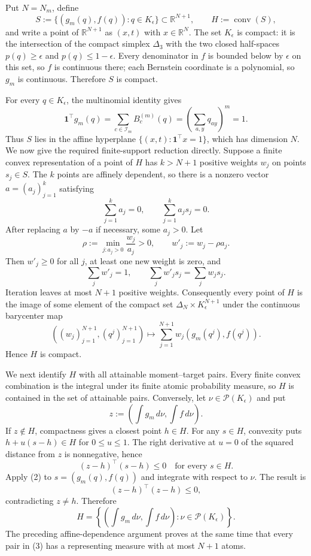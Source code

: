 Put \(N=N_m\), define
\[
 S:=\{(g_m(q),f(q)):q\in K_{\epsilon}\}\subset\mathbb R^{N+1},
 \qquad H:=\operatorname{conv}(S),
\]
and write a point of \(\mathbb R^{N+1}\) as \((x,t)\) with \(x\in\mathbb R^N\). The set \(K_{\epsilon}\) is compact: it is the intersection of the compact simplex \(\Delta_3\) with the two closed half-spaces \(p(q)\geq\epsilon\) and \(p(q)\leq1-\epsilon\). Every denominator in \(f\) is bounded below by \(\epsilon\) on this set, so \(f\) is continuous there; each Bernstein coordinate is a polynomial, so \(g_m\) is continuous. Therefore \(S\) is compact.

For every \(q\in K_{\epsilon}\), the multinomial identity gives
\[
 \mathbf 1^{\top}g_m(q)
 =\sum_{c\in\mathcal I_m}B_c^{(m)}(q)
 =\left(\sum_{a,y}q_{ay}\right)^m=1.
\tag{1}
\]
Thus \(S\) lies in the affine hyperplane \(\{(x,t):\mathbf 1^{\top}x=1\}\), which has dimension \(N\). We now give the required finite-support reduction directly. Suppose a finite convex representation of a point of \(H\) has \(k>N+1\) positive weights \(w_j\) on points \(s_j\in S\). The \(k\) points are affinely dependent, so there is a nonzero vector \(a=(a_j)_{j=1}^k\) satisfying
\[
 \sum_{j=1}^ka_j=0,
 \qquad
 \sum_{j=1}^ka_js_j=0.
\]
After replacing \(a\) by \(-a\) if necessary, some \(a_j>0\). Let
\[
 \rho:=\min_{j:a_j>0}\frac{w_j}{a_j}>0,
 \qquad w'_j:=w_j-\rho a_j.
\]
Then \(w'_j\geq0\) for all \(j\), at least one new weight is zero, and
\[
 \sum_jw'_j=1,
 \qquad
 \sum_jw'_js_j=\sum_jw_js_j.
\]
Iteration leaves at most \(N+1\) positive weights. Consequently every point of \(H\) is the image of some element of the compact set \(\Delta_N\times K_{\epsilon}^{N+1}\) under the continuous barycenter map
\[
 ((w_j)_{j=1}^{N+1},(q^j)_{j=1}^{N+1})
 \longmapsto
 \sum_{j=1}^{N+1}w_j(g_m(q^j),f(q^j)).
\]
Hence \(H\) is compact.

We next identify \(H\) with all attainable moment--target pairs. Every finite convex combination is the integral under its finite atomic probability measure, so \(H\) is contained in the set of attainable pairs. Conversely, let \(\nu\in\mathcal P(K_{\epsilon})\) and put
\[
 z:=\left(\int g_m\,d\nu,\int f\,d\nu\right).
\]
If \(z\notin H\), compactness gives a closest point \(h\in H\). For any \(s\in H\), convexity puts \(h+u(s-h)\in H\) for \(0\leq u\leq1\). The right derivative at \(u=0\) of the squared distance from \(z\) is nonnegative, hence
\[
 (z-h)^{\top}(s-h)\leq0
 \quad\text{for every }s\in H.
\tag{2}
\]
Apply (2) to \(s=(g_m(q),f(q))\) and integrate with respect to \(\nu\). The result is
\[
 (z-h)^{\top}(z-h)\leq0,
\]
contradicting \(z\neq h\). Therefore
\[
 H=
 \left\{\left(\int g_m\,d\nu,\int f\,d\nu\right):
 \nu\in\mathcal P(K_{\epsilon})\right\}.
\tag{3}
\]
The preceding affine-dependence argument proves at the same time that every pair in (3) has a representing measure with at most \(N+1\) atoms.

